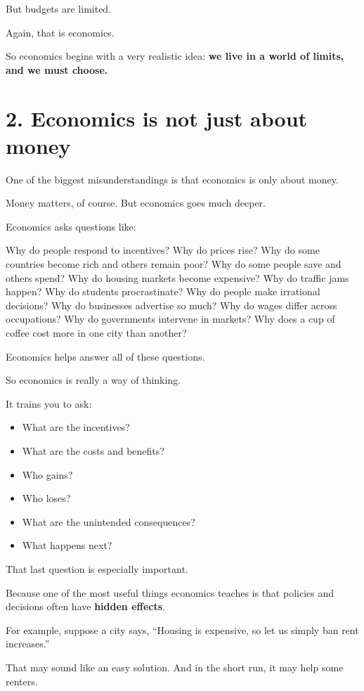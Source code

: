 \documentclass[12pt]{article}
\begin{document}
But budgets are limited.

Again, that is economics.

So economics begins with a very realistic idea:  
\textbf{we live in a world of limits, and we must choose.}

\section*{2. Economics is not just about money}

One of the biggest misunderstandings is that economics is only about money.

Money matters, of course. But economics goes much deeper.

Economics asks questions like:

Why do people respond to incentives?  
Why do prices rise?  
Why do some countries become rich and others remain poor?  
Why do some people save and others spend?  
Why do housing markets become expensive?  
Why do traffic jams happen?  
Why do students procrastinate?  
Why do people make irrational decisions?  
Why do businesses advertise so much?  
Why do wages differ across occupations?  
Why do governments intervene in markets?  
Why does a cup of coffee cost more in one city than another?

Economics helps answer all of these questions.

So economics is really a way of thinking.

It trains you to ask:
\begin{itemize}[leftmargin=2em]
    \item What are the incentives?
    \item What are the costs and benefits?
    \item Who gains?
    \item Who loses?
    \item What are the unintended consequences?
    \item What happens next?
\end{itemize}

That last question is especially important.

Because one of the most useful things economics teaches is that policies and decisions often have \textbf{hidden effects}.

For example, suppose a city says, ``Housing is expensive, so let us simply ban rent increases.''

That may sound like an easy solution. And in the short run, it may help some renters.
\end{document}
